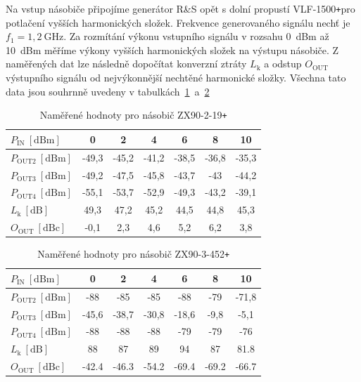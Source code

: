 \documentclass[11pt,a4paper]{article}
\newcommand{\plus}{{\texttt{+}}}
\begin{document}
Na vstup násobiče připojíme generátor R\&S opět s dolní propustí VLF-1500\plus pro potlačení vyšších harmonických složek. Frekvence generovaného signálu nechť je $f_1 = 1,2 \ \mathrm{GHz}$. Za rozmítání výkonu vstupního signálu v rozsahu 0~dBm až 10~dBm měříme výkony vyšších harmonických složek na výstupu násobiče. Z naměřených dat lze následně dopočítat konverzní ztráty $L_{\mathrm k}$ a odstup $O_{\mathrm{OUT}}$ výstupního signálu od nejvýkonnější nechtěné harmonické složky. Všechna tato data jsou souhrnně uvedeny v tabulkách~\ref{table:task4-data_ZX90-2-19+}~a~\ref{table:task4-data_ZX90-3-452+}
\begin{table}[!ht]
    \centering
    \begin{tabular}{| l || c | c | c | c | c | c |}
        \hline
        $P_{\mathrm{IN}} \ [\mathrm{dBm}]$ & 0 & 2 & 4 & 6 & 8 & 10\\
        \hline\hline
        $P_{\mathrm{OUT2}} \ [\mathrm{dBm}]$ & -49,3 & -45,2 & -41,2 & -38,5 & -36,8 & -35,3\\
        \hline
        $P_{\mathrm{OUT3}} \ [\mathrm{dBm}]$ & -49,2 & -47,5 & -45,8 & -43,7 & -43 & -44,2\\
        \hline
        $P_{\mathrm{OUT4}} \ [\mathrm{dBm}]$ & -55,1 & -53,7 & -52,9 & -49,3 & -43,2 & -39,1\\
        \hline\hline
        $L_{\mathrm{k}} \ [\mathrm{dB}]$ & 49,3 & 47,2 & 45,2 & 44,5 & 44,8 & 45,3\\
        \hline
        $O_{\mathrm{OUT}} \ [\mathrm{dBc}]$ & -0,1 & 2,3 & 4,6 & 5,2 & 6,2 & 3,8\\
        \hline
    \end{tabular}
    \caption{Naměřené hodnoty pro násobič ZX90-2-19\plus}
    \label{table:task4-data_ZX90-2-19+}
\end{table}
\begin{table}[!ht]
    \centering
    \begin{tabular}{| l || c | c | c | c | c | c |}
        \hline
        $P_{\mathrm{IN}} \ [\mathrm{dBm}]$ & 0 & 2 & 4 & 6 & 8 & 10\\
        \hline\hline
        $P_{\mathrm{OUT2}} \ [\mathrm{dBm}]$ & -88 & -85 & -85 & -88 & -79 & -71,8\\
        \hline
        $P_{\mathrm{OUT3}} \ [\mathrm{dBm}]$ & -45,6 & -38,7 & -30,8 & -18,6 & -9,8 & -5,1\\
        \hline
        $P_{\mathrm{OUT4}} \ [\mathrm{dBm}]$ & -88 & -88 & -88 & -79 & -79 & -76\\
        \hline\hline
        $L_{\mathrm{k}} \ [\mathrm{dB}]$ & 88 & 87 & 89 & 94 & 87 & 81.8\\
        \hline
        $O_{\mathrm{OUT}} \ [\mathrm{dBc}]$ & -42.4 & -46.3 & -54.2 & -69.4 & -69.2 & -66.7\\
        \hline
    \end{tabular}
    \caption{Naměřené hodnoty pro násobič ZX90-3-452\plus}
    \label{table:task4-data_ZX90-3-452+}
\end{table}
\end{document}
